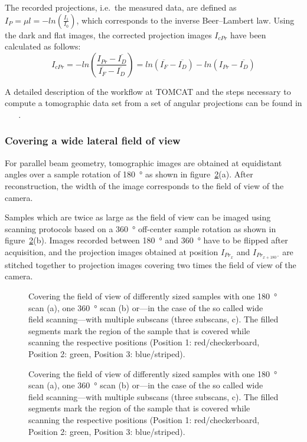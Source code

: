 The recorded projections, i.e.\ the measured data, are defined as $I_{P}=\mu l=-ln\left(\frac{I_{1}}{I_{0}}\right)$, which corresponds to the inverse Beer--Lambert law. Using the dark and flat images, the corrected projection images $I_{cPr}$ have been calculated as follows:
\begin{equation}
	I_{cPr} = -ln\left(\frac{I_{Pr}-\overline{I_{D}}}{\overline{I_{F}}-\overline{I_{D}}}\right)
	= ln(\overline{I_{F}}-\overline{I_{D}})-ln(I_{Pr}-\overline{I_{D}})
	\label{eq:cpr}
\end{equation}

A detailed description of the workflow at TOMCAT and the steps necessary to compute a tomographic data set from a set of angular projections can be found in%
\ifhtml
	~\citet{Hintermueller2009}
\else
	~
\fi%
.

\subsubsection{Covering a wide lateral field of view}%
For parallel beam geometry, tomographic images are obtained at equidistant angles over a sample rotation of \SI{180}{\degree} as shown in figure~\ref{fig:scanning-possibilities}(a). After reconstruction, the width of the image corresponds to the field of view of the camera.

Samples which are twice as large as the field of view can be imaged using scanning protocols based on a \SI{360}{\degree} off-center sample rotation as shown in figure~\ref{fig:scanning-possibilities}(b). Images recorded between \SI{180}{\degree} and \SI{360}{\degree} have to be flipped after acquisition, and the projection images obtained at position $I_{Pr_{x}}$ and $I_{Pr_{x+\SI{180}{\degree}}}$ are stitched together to projection images covering two times the field of view of the camera.

\ifiucr
	\begin{figure}
		\centering
		\caption{Covering the field of view of differently sized samples with one \SI{180}{\degree} scan (a), one \SI{360}{\degree} scan (b) or---in the case of the so called wide field scanning---with multiple subscans (three subscans, c). The filled segments mark the region of the sample that is covered while scanning the respective positions (Position 1: red/checkerboard, Position 2: green, Position 3: blue/striped).}%
		\label{fig:scanning-possibilities}%
	\end{figure}
\else
	\begin{figure}
		\label{subfig:scanning-possibilities}%
		\caption{Covering the field of view of differently sized samples with one \SI{180}{\degree} scan (a), one \SI{360}{\degree} scan (b) or---in the case of the so called wide field scanning---with multiple subscans (three subscans, c). The filled segments mark the region of the sample that is covered while scanning the respective positions (Position 1: red/checkerboard, Position 2: green, Position 3: blue/striped).}%
		\label{fig:scanning-possibilities}%
	\end{figure}
\fi

